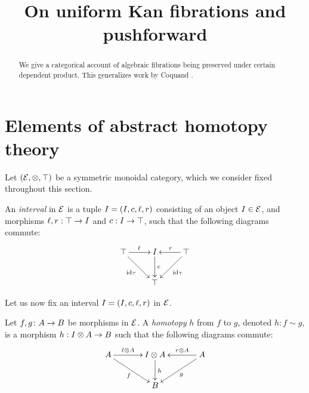 \documentclass[reqno,10pt,a4paper,oneside]{amsart}
\title{On uniform Kan fibrations and pushforward}
\begin{document}
\begin{abstract}
We give a categorical account of algebraic fibrations being preserved under certain dependent product.
This generalizes work by Coquand \etal.
\end{abstract}

\maketitle

\tableofcontents





\section{Elements of abstract homotopy theory} 

Let $(\mathcal{E}, \otimes, \top)$ be a symmetric monoidal category, which we consider fixed throughout this section. 

\begin{definition} An \emph{interval} in $\mathcal{E}$ is a tuple $I = (I, c, \ell, r)$ consisting of  an object $I \in \mathcal{E}$, 
and morphisms $\ell, r : \top \to I$ and $c : I \to \top$,   such that the following diagrams commute:
\[
\xymatrix{
\unit \ar[r]^\intervall \ar[dr]_{\id_\unit} & \interval \ar[d]^-{c} & \unit \ar[dl]^{\id_\unit} \ar[l]_{\intervalr}  \\
 & \unit & }
 \]
\end{definition}

Let us now fix an interval $I = (I, c, \ell, r)$ in $\mathcal{E}$. 


\begin{definition}
\label{def:homotopy}
Let $f, g \colon A \to B$ be morphisms in $\mathcal{E}$. A \emph{homotopy} $h$ from $f$ to $g$, denoted $h : f \sim g$, is a morphism $h : I \otimes A \to B$ such that the following diagrams commute:
\[
\xymatrix@C=1.2cm{
A \ar[r]^-{\intervall \otimes A} \ar[dr]_{f} & \interval \otimes A \ar[d]^{h} & A \ar[dl]^{g} \ar[l]_-{r \otimes A}  \\
 & B & }
 \]
\end{definition}
\end{document}
